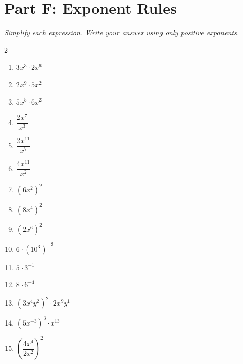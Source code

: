 \documentclass[11pt]{article}
\begin{document}
\section*{Part F: Exponent Rules}
\noindent\textit{Simplify each expression. Write your answer using only positive exponents.}
\begin{multicols}{2}
\begin{enumerate}
  \item $3x^{3} \cdot 2x^{6}$
  \vspace{1.4cm}
  \item $2x^{9} \cdot 5x^{2}$
  \vspace{1.4cm}
  \item $5x^{5} \cdot 6x^{2}$
  \vspace{1.4cm}
  \item $\dfrac{2x^{7}}{x^{3}}$
  \vspace{1.4cm}
  \item $\dfrac{2x^{11}}{x^{7}}$
  \vspace{1.4cm}
  \item $\dfrac{4x^{11}}{x^{2}}$
  \vspace{1.4cm}
  \item $(6x^{2})^{2}$
  \vspace{1.4cm}
  \item $(8x^{4})^{2}$
  \vspace{1.4cm}
  \item $(2x^{6})^{2}$
  \vspace{1.4cm}
  \item $6 \cdot (10^{3})^{-3}$
  \vspace{1.4cm}
  \item $5 \cdot 3^{-1}$
  \vspace{1.4cm}
  \item $8 \cdot 6^{-4}$
  \vspace{1.4cm}
  \item $(3x^{4}y^{2})^{2} \cdot 2x^{9}y^{1}$
  \vspace{1.4cm}
  \item $(5x^{-3})^{3} \cdot x^{13}$
  \vspace{1.4cm}
  \item $\left(\dfrac{4x^{4}}{2x^{2}}\right)^{2}$
  \vspace{1.4cm}
\end{enumerate}
\end{multicols}
\end{document}

